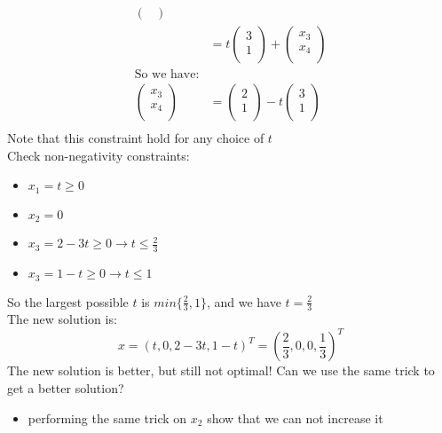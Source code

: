\documentclass[letterpaper, 12pt]{article}
\begin{document}
\begin{align*}
\begin{pmatrix}
        \end{pmatrix}\\
        &= t\begin{pmatrix}
            3\\
            1\\
        \end{pmatrix} + \begin{pmatrix}
            x_3\\
            x_4\\
        \end{pmatrix}\\
        \text{So we have:}\\
        \begin{pmatrix}
            x_3\\
            x_4\\
        \end{pmatrix} &=\begin{pmatrix}
            2\\
            1\\
        \end{pmatrix} - t\begin{pmatrix}
            3\\
            1\\
        \end{pmatrix}\\
    \end{align*}
    Note that this constraint hold for any choice of $t$\\
    \bigskip
    Check non-negativity constraints:
    \begin{itemize}
        \item $x_1 = t \geq 0$\\
        \item $x_2 = 0$\\
        \item $x_3 = 2 - 3t \geq 0 \rightarrow t \leq \frac{2}{3}$
        \item $x_3 = 1 - t \geq 0 \rightarrow t \leq 1$
    \end{itemize}
    \pagebreak
    So the largest possible $t$ is $min\{\frac{2}{3}, 1\}$, and we have $t = \frac{2}{3}$\\
    The new solution is:
    $$x = (t, 0, 2 - 3t, 1 - t)^T = (\frac{2}{3}, 0, 0, \frac{1}{3})^T$$
    \bigskip
    The new solution is better, but still not optimal!
    Can we use the same trick to get a better solution?
    \begin{itemize}
        \item performing the same trick on $x_2$ show that we can not increase it
    \end{itemize}
\end{document}
